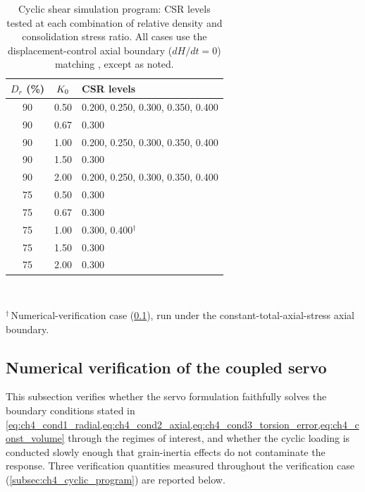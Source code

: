 \documentclass[../main]{subfiles}
\begin{document}
\begin{table}[t]
  \centering
  \caption{Cyclic shear simulation program: CSR levels tested at each combination of relative density and consolidation stress ratio. All cases use the displacement-control axial boundary ($dH/dt=0$) matching \citet{Ishihara1985}, except as noted.}
  \label{tab:ch4_case_matrix}
  \begin{tabular}{@{}ccl@{}}
    \toprule
    $D_r$ (\%) & $K_0$ & CSR levels \\
    \midrule
    90 & 0.50 & 0.200, 0.250, 0.300, 0.350, 0.400 \\
    90 & 0.67 & 0.300 \\
    90 & 1.00 & 0.200, 0.250, 0.300, 0.350, 0.400 \\
    90 & 1.50 & 0.300 \\
    90 & 2.00 & 0.200, 0.250, 0.300, 0.350, 0.400 \\
    \midrule
    75 & 0.50 & 0.300 \\
    75 & 0.67 & 0.300 \\
    75 & 1.00 & 0.300, 0.400$^{\dagger}$ \\
    75 & 1.50 & 0.300 \\
    75 & 2.00 & 0.300 \\
    \bottomrule
  \end{tabular}\\[2pt]
  \begin{minipage}{0.95\linewidth}
    \footnotesize $^{\dagger}$\,Numerical-verification case (\cref{subsec:ch4_verification}), run under the constant-total-axial-stress axial boundary.
  \end{minipage}
\end{table}

\subsection{Numerical verification of the coupled servo}
\label{subsec:ch4_verification}

This subsection verifies whether the servo formulation faithfully solves the boundary conditions stated in \cref{eq:ch4_cond1_radial,eq:ch4_cond2_axial,eq:ch4_cond3_torsion_error,eq:ch4_const_volume} through the regimes of interest, and whether the cyclic loading is conducted slowly enough that grain-inertia effects do not contaminate the response. Three verification quantities measured throughout the verification case (\cref{subsec:ch4_cyclic_program}) are reported below.
\end{document}
